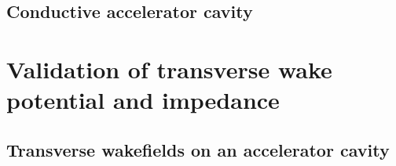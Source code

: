 


\subsection{Conductive accelerator cavity}


\section{Validation of transverse wake potential and impedance}


\subsection{Transverse wakefields on an accelerator cavity}


